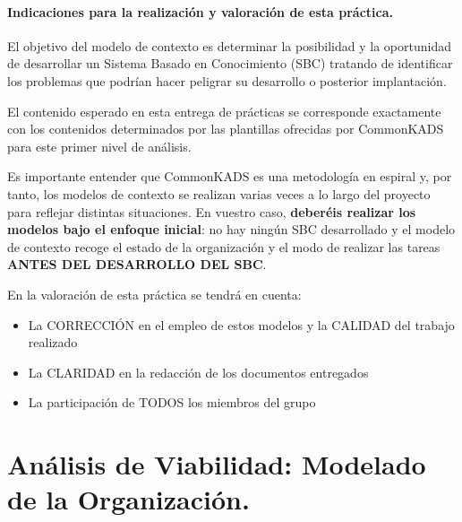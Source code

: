 \documentclass[12pt,a4paper,twoside,spanish]{article}      %
\begin{document}
\setlength{\parindent}{1,5cm} \setlength{\parskip}{0,7cm}

\paragraph{Indicaciones para la realización y valoración de esta práctica.}

El objetivo del modelo de contexto es determinar la posibilidad y la oportunidad de desarrollar un Sistema Basado en Conocimiento (SBC) tratando de identificar los problemas que podrían hacer peligrar su desarrollo o posterior implantación.

El contenido esperado en esta entrega de prácticas se corresponde exactamente con los contenidos determinados por las plantillas ofrecidas por CommonKADS para este primer nivel de análisis.


Es importante entender que CommonKADS es una metodología en espiral y, por tanto, los modelos de contexto se realizan varias veces a lo largo del proyecto para reflejar distintas situaciones. En vuestro caso, \textbf{deberéis realizar los modelos bajo el enfoque inicial}: no hay ningún SBC desarrollado y el modelo de contexto recoge el estado de la organización y el modo de realizar las tareas \textbf{ANTES DEL DESARROLLO DEL SBC}. 

En la valoración de esta práctica se tendrá en cuenta:
\begin{itemize}
    \item La CORRECCIÓN en el empleo de estos modelos y la CALIDAD del trabajo realizado
    \item La CLARIDAD en la redacción de los documentos entregados    
    \item   La participación de TODOS los miembros del grupo  
\end{itemize}


\cleardoublepage

\section{Análisis de Viabilidad: Modelado de la Organización.}
\end{document}
